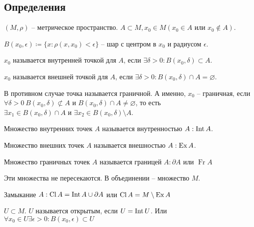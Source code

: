 \documentclass[main]{subfiles}
\begin{document}
\subsection{Определения}
\begin{definition}
    $(M, \rho)$ -- метрическое пространство. $A \subset M, x_0 \in M (x_0 \in A \text{ или } x_0 \not\in A)$.

    $B(x_0, \epsilon) \coloneqq \{x: \rho(x, x_0) < \epsilon\}$ -- шар с центром в $x_0$ и радиусом $\epsilon$.

    $x_0$ называется внутренней точкой  для $A$, если $\exists \delta>0 : B(x_0, \delta) \subset A$.

    $x_0$ называется внешней точкой  для $A$, если $\exists \delta>0 : B(x_0, \delta) \cap A = \varnothing$.

    В противном случае точка называется граничной.
    А именно, $x_0$ -- граничная, если
    $\forall \delta >0 \ B(x_0, \delta) \not\subset A \text{ и }
        B(x_0, \delta) \cap A \neq \varnothing$, то есть
    $\exists x_1 \in  B(x_0, \delta) \cap A \text{ и }
        \exists x_2 \in B(x_0, \delta) \setminus A$.
\end{definition}

\begin{definition}
    Множество внутренних точек $A$ называется внутренностью $A: \operatorname{Int} A$.

    Множество внешних точек $A$ называется внешностью $A: \operatorname{Ex} A$.

    Множество граничных точек $A$ называется границей $A: \partial A$ или $\operatorname{Fr}A$
\end{definition}
\begin{remark}
    Эти множества не пересекаются. В объединении -- множество $M$.
\end{remark}

\begin{definition}
    Замыкание $A: \operatorname{Cl} A = \operatorname{Int} A \cup \partial A$
    или $\operatorname{Cl} A = M \setminus \operatorname{Ex} A$
\end{definition}

\begin{definition}
    $U \subset M$. $U$ называется открытым, если $U= \operatorname{Int} U$.
    Или $\forall x_0 \in U \exists \epsilon > 0: B(x_0, \epsilon) \subset U$
\end{definition}
\end{document}
